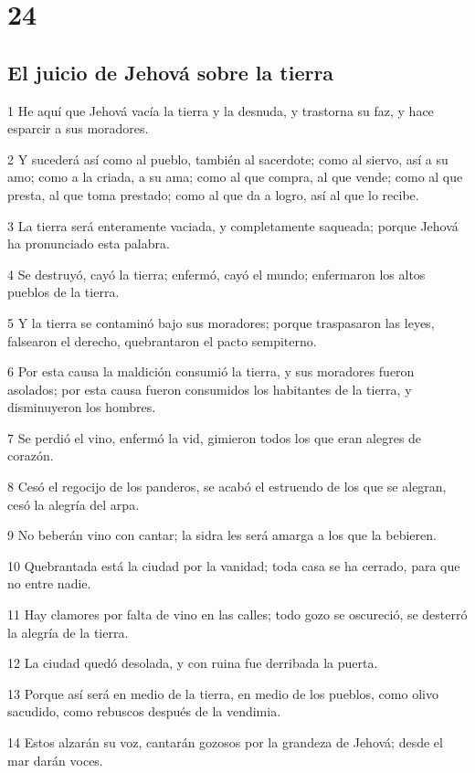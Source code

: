 \chapter{24}

\section*{El juicio de Jehová sobre la tierra}

\par 1 He aquí que Jehová vacía la tierra y la desnuda, y trastorna su faz, y hace esparcir a sus moradores.
\par 2 Y sucederá así como al pueblo, también al sacerdote; como al siervo, así a su amo; como a la criada, a su ama; como al que compra, al que vende; como al que presta, al que toma prestado; como al que da a logro, así al que lo recibe.
\par 3 La tierra será enteramente vaciada, y completamente saqueada; porque Jehová ha pronunciado esta palabra.
\par 4 Se destruyó, cayó la tierra; enfermó, cayó el mundo; enfermaron los altos pueblos de la tierra.
\par 5 Y la tierra se contaminó bajo sus moradores; porque traspasaron las leyes, falsearon el derecho, quebrantaron el pacto sempiterno.
\par 6 Por esta causa la maldición consumió la tierra, y sus moradores fueron asolados; por esta causa fueron consumidos los habitantes de la tierra, y disminuyeron los hombres.
\par 7 Se perdió el vino, enfermó la vid, gimieron todos los que eran alegres de corazón.
\par 8 Cesó el regocijo de los panderos, se acabó el estruendo de los que se alegran, cesó la alegría del arpa.
\par 9 No beberán vino con cantar; la sidra les será amarga a los que la bebieren.
\par 10 Quebrantada está la ciudad por la vanidad; toda casa se ha cerrado, para que no entre nadie.
\par 11 Hay clamores por falta de vino en las calles; todo gozo se oscureció, se desterró la alegría de la tierra.
\par 12 La ciudad quedó desolada, y con ruina fue derribada la puerta.
\par 13 Porque así será en medio de la tierra, en medio de los pueblos, como olivo sacudido, como rebuscos después de la vendimia.
\par 14 Estos alzarán su voz, cantarán gozosos por la grandeza de Jehová; desde el mar darán voces.
